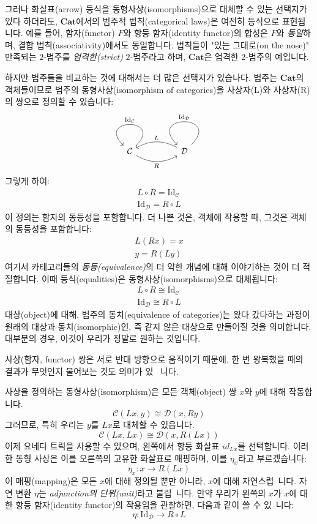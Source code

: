 \documentclass[DaoFP]{subfiles}
\begin{document}
그러나 화살표(arrow) 등식을 동형사상(isomorphisms)으로 대체할 수 있는 선택지가 있다 하더라도, $\mathbf{Cat}$에서의 범주적 법칙(categorical laws)은 여전히 등식으로 표현됩니다. 예를 들어, 함자(functor) $F$와 항등 함자(identity functor)의 합성은 $F$와 \emph{동일}하며, 결합 법칙(associativity)에서도 동일합니다. 법칙들이 "있는 그대로(on the nose)" 만족되는 $2$-범주를 \emph{엄격한(strict)} $2$-범주라고 하며, $\mathbf{Cat}$은 엄격한 $2$-범주의 예입니다.

하지만 범주들을 비교하는 것에 대해서는 더 많은 선택지가 있습나다. 범주는 $\mathbf{Cat}$의 객체들이므로 범주의 동형사상(isomorphism of categories)을 사상자(L)와 사상자(R)의 쌍으로 정의할 수 있습니다:
\[
 \begin{tikzcd}
  \mathcal{C}
  \arrow[rr, bend right, "R"']
  \arrow[loop, "\text{Id}_{ \mathcal{C}} "']
  &&
  \mathcal{D}
  \arrow[ll, bend right, "L"']
  \arrow[loop, "\text{Id}_{ \mathcal{D}} "']
  \end{tikzcd}
\]
그렇게 하여:
\begin{align*}
L \circ R = \text{Id}_{ \mathcal{C}} \\
\text{Id}_{ \mathcal{D}} = R \circ L 
\end{align*}
이 정의는 함자의 동등성을 포함합니다. 더 나쁜 것은, 객체에 작용할 때, 그것은 객체의 동등성을 포함합니다:
\begin{align*}
 L (R x) = x \\
 y = R (L y)
\end{align*}
여기서 카테고리들의 \emph{동등(equivalence)}의 더 약한 개념에 대해 이야기하는 것이 더 적절합니다. 이때 등식(equalities)은 동형사상(isomorphisms)으로 대체됩니다:
\begin{align*}
L \circ R \cong \text{Id}_{ \mathcal{C}} \\
 \text{Id}_{ \mathcal{D}} \cong R \circ L 
\end{align*}
대상(object)에 대해, 범주의 동치(equivalence of categories)는 왔다 갔다하는 과정이 원래의 대상과 동치(isomorphic)인, 즉 같지 않은 대상으로 만들어질 것을 의미합니다. 대부분의 경우, 이것이 우리가 정말로 원하는 것입니다.

사상(함자, functor) 쌍은 서로 반대 방향으로 움직이기 때문에, 한 번 왕복했을 때의 결과가 무엇인지 물어보는 것도 의미가 있 ~니다.

사상을 정의하는 동형사상(isomorphism)은 모든 객체(object) 쌍 $x$와 $y$에 대해 작동합니다.
\[  \mathcal{C} (L x, y) \cong \mathcal{D}( x , R y)\]
그러므로, 특히 우리는 $y$를 $L x$로 대체할 수 있읍니다.
\[  \mathcal{C} (L x, L x) \cong \mathcal{D}( x , R (L x))\]
이제 요네다 트릭을 사용할 수 있으며, 왼쪽에서 항등 화살표 $id_{L x}$를 선택합니다. 이러한 동형 사상은 이를 오른쪽의 고유한 화살표로 매핑하며, 이를 $\eta_x$라고 부르겠습니다:
\[ \eta_x \colon x \to R ( L x) \]
이 매핑(mapping)은 모든 $x$에 대해 정의될 뿐만 아니라, $x$에 대해 자연스럽~니다. 자연 변환 $\eta$는 \emph{adjunction의 단위(unit)}라고 불립~니다. 만약 우리가 왼쪽의 $x$가 $x$에 대한 항등 함자(identity functor)의 작용임을 관찰하면, 다음과 같이 쓸 수 있~니다:
\[ \eta \colon \text{Id}_{\mathcal{D}} \to R \circ L \]
\end{document}
